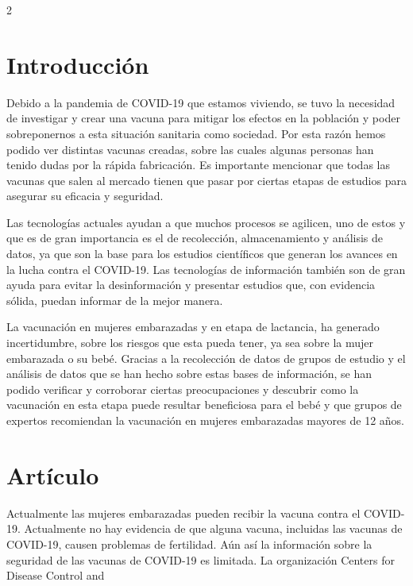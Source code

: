 \documentclass[12pt,spanish,Letterpaper,openany]{book}
\begin{document}
\begin {multicols}{2}

\hypertarget{introducciuxf3n-4}{%
\section{Introducción}\label{introducciuxf3n-4}}

Debido a la pandemia de COVID-19 que estamos viviendo, se tuvo la necesidad de investigar y crear una vacuna
para mitigar los efectos en la población y poder sobreponernos a esta situación sanitaria como sociedad. Por esta
razón hemos podido ver distintas vacunas creadas, sobre las cuales algunas personas han tenido dudas por la rápida
fabricación. Es importante mencionar que todas las vacunas que salen al mercado tienen que pasar por ciertas etapas
de estudios para asegurar su eficacia y seguridad.

Las tecnologías actuales ayudan a que muchos procesos se agilicen, uno de estos y que es de gran importancia es el
de recolección, almacenamiento y análisis de datos, ya que son la base para los estudios científicos que generan los
avances en la lucha contra el COVID-19. Las tecnologías de información también son de gran ayuda para evitar la
desinformación y presentar estudios que, con evidencia sólida, puedan informar de la mejor manera.

La vacunación en mujeres embarazadas y en etapa de lactancia, ha generado incertidumbre, sobre los riesgos que
esta pueda tener, ya sea sobre la mujer embarazada o su bebé. Gracias a la recolección de datos de grupos de estudio
y el análisis de datos que se han hecho sobre estas bases de información, se han podido verificar y corroborar ciertas
preocupaciones y descubrir como la vacunación en esta etapa puede resultar beneficiosa para el bebé y que grupos
de expertos recomiendan la vacunación en mujeres embarazadas mayores de 12 años.

\hypertarget{artuxedculo-8}{%
\section{Artículo}\label{artuxedculo-8}}

Actualmente las mujeres embarazadas pueden recibir la vacuna contra el COVID-19. Actualmente no hay evidencia
de que alguna vacuna, incluidas las vacunas de COVID-19, causen problemas de fertilidad. Aún así la información
sobre la seguridad de las vacunas de COVID-19 es limitada. La organización Centers for Disease Control and


\end{multicols}
\end{document}
